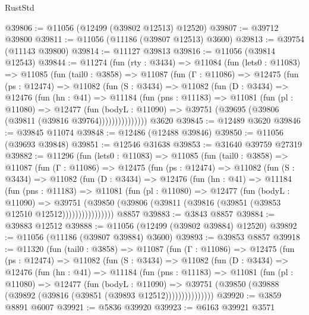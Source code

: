 \begin{lexlean}{RustStd}
\begin{coremodule}
@39806 := @11056 (@12499 (@39802 @12513) @12520)
@39807 := @39712 @39800
@39811 := @11056 (@11186 (@39807 @12513) @3600)
@39813 := @39754 (@11143 @39800)
@39814 := @11127 @39813
@39816 := @11056 (@39814 @12543)
@39844 := @11274
    (fun (rty : @3434) =>
    @11084
      (fun (lets0 : @11083) =>
      @11085
        (fun (tail0 : @3858) =>
        @11087
          (fun (Γ : @11086) =>
          @12475
            (fun (ps : @12474) =>
            @11082
              (fun (S : @3434) =>
              @11082
                (fun (D : @3434) =>
                @12476
                  (fun (hn : @41) =>
                  @11184
                    (fun (pns : @11183) =>
                    @11081
                      (fun (pl : @11080) =>
                      @12477
                        (fun (bodyL : @11090) =>
                        @39751 (@39695 (@39806 (@39811 (@39816 @39764)))))))))))))))
    @3620
@39845 := @12489 @3620
@39846 := @39845 @11074
@39848 := @12486 (@12488 @39846)
@39850 := @11056 (@39693 @39848)
@39851 := @12546 @31638
@39853 := @31640 @39759 @27319
@39882 := @11296
    (fun (lets0 : @11083) =>
    @11085
      (fun (tail0 : @3858) =>
      @11087
        (fun (Γ : @11086) =>
        @12475
          (fun (ps : @12474) =>
          @11082
            (fun (S : @3434) =>
            @11082
              (fun (D : @3434) =>
              @12476
                (fun (hn : @41) =>
                @11184
                  (fun (pns : @11183) =>
                  @11081
                    (fun (pl : @11080) =>
                    @12477
                      (fun (bodyL : @11090) =>
                      @39751
                        (@39850
                          (@39806 (@39811 (@39816 (@39851 (@39853 @12510 @12512))))))))))))))))
    @8857
@39883 := @3843 @8857
@39884 := @39883 @12512
@39888 := @11056 (@12499 (@39802 @39884) @12520)
@39892 := @11056 (@11186 (@39807 @39884) @3600)
@39893 := @39853 @8857
@39918 := @11320
    (fun (tail0 : @3858) =>
    @11087
      (fun (Γ : @11086) =>
      @12475
        (fun (ps : @12474) =>
        @11082
          (fun (S : @3434) =>
          @11082
            (fun (D : @3434) =>
            @12476
              (fun (hn : @41) =>
              @11184
                (fun (pns : @11183) =>
                @11081
                  (fun (pl : @11080) =>
                  @12477
                    (fun (bodyL : @11090) =>
                    @39751 (@39850 (@39888 (@39892 (@39816 (@39851 (@39893 @12512)))))))))))))))
@39920 := @3859 @8891 @6007
@39921 := @5836 @39920
@39923 := @6163 @39921 @3571

\end{coremodule}
\end{lexlean}
